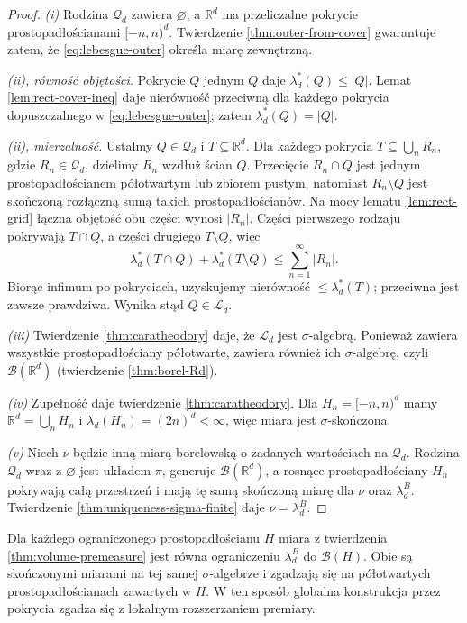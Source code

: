 \begin{proof}
\emph{(i)} Rodzina $\mathcal Q_d$ zawiera $\varnothing$,
a $\mathbb R^d$ ma przeliczalne pokrycie prostopadłościanami
$[-n,n)^d$. Twierdzenie \ref{thm:outer-from-cover}
gwarantuje zatem, że \eqref{eq:lebesgue-outer}
określa miarę zewnętrzną.

\emph{(ii), równość objętości.}
Pokrycie $Q$ jednym $Q$ daje $\lambda_d^*(Q)\le|Q|$.
Lemat \ref{lem:rect-cover-ineq} daje nierówność
przeciwną dla każdego pokrycia dopuszczalnego w
\eqref{eq:lebesgue-outer}; zatem $\lambda_d^*(Q)=|Q|$.

\emph{(ii), mierzalność.}
Ustalmy $Q\in\mathcal Q_d$ i $T\subseteq\mathbb R^d$.
Dla każdego pokrycia $T\subseteq\bigcup_nR_n$, gdzie
$R_n\in\mathcal Q_d$, dzielimy $R_n$ wzdłuż ścian $Q$.
Przecięcie $R_n\cap Q$ jest jednym prostopadłościanem
półotwartym lub zbiorem pustym, natomiast
$R_n\setminus Q$ jest skończoną rozłączną sumą
takich prostopadłościanów. Na mocy lematu
\ref{lem:rect-grid} łączna objętość obu części wynosi
$|R_n|$. Części pierwszego rodzaju pokrywają
$T\cap Q$, a części drugiego $T\setminus Q$, więc
\[
\lambda_d^*(T\cap Q)+\lambda_d^*(T\setminus Q)
\le\sum_{n=1}^\infty |R_n|.
\]
Biorąc infimum po pokryciach, uzyskujemy nierówność
$\le\lambda_d^*(T)$; przeciwna jest zawsze prawdziwa.
Wynika stąd $Q\in\mathcal L_d$.

\emph{(iii)} Twierdzenie \ref{thm:caratheodory} daje,
że $\mathcal L_d$ jest $\sigma$-algebrą. Ponieważ zawiera
wszystkie prostopadłościany półotwarte, zawiera również
ich $\sigma$-algebrę, czyli $\mathcal B(\mathbb R^d)$
(twierdzenie \ref{thm:borel-Rd}).

\emph{(iv)} Zupełność daje twierdzenie
\ref{thm:caratheodory}. Dla $H_n=[-n,n)^d$ mamy
$\mathbb R^d=\bigcup_nH_n$ i
$\lambda_d(H_n)=(2n)^d<\infty$, więc miara jest
$\sigma$-skończona.

\emph{(v)} Niech $\nu$ będzie inną miarą borelowską
o zadanych wartościach na $\mathcal Q_d$.
Rodzina $\mathcal Q_d$ wraz z $\varnothing$ jest
układem $\pi$, generuje $\mathcal B(\mathbb R^d)$,
a rosnące prostopadłościany $H_n$ pokrywają całą
przestrzeń i mają tę samą skończoną miarę dla
$\nu$ oraz $\lambda_d^B$. Twierdzenie
\ref{thm:uniqueness-sigma-finite} daje
$\nu=\lambda_d^B$.
\end{proof}

\begin{uwaga}
Dla każdego ograniczonego prostopadłościanu $H$
miara z twierdzenia \ref{thm:volume-premeasure} jest
równa ograniczeniu $\lambda_d^B$ do
$\mathcal B(H)$. Obie są skończonymi miarami na
tej samej $\sigma$-algebrze i zgadzają się na
półotwartych prostopadłościanach zawartych w $H$.
W ten sposób globalna konstrukcja przez pokrycia
zgadza się z lokalnym rozszerzaniem premiary.
\end{uwaga}

